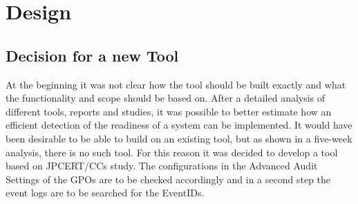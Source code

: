 \section{Design}
\subsection{Decision for a new Tool}
At the beginning it was not clear how the tool should be built exactly and what the functionality and scope should be based on. After a detailed analysis of different tools, reports and studies, it was possible to better estimate how an efficient detection of the readiness of a system can be implemented. It would have been desirable to be able to build on an existing tool, but as shown in a five-week analysis, there is no such tool. For this reason it was decided to develop a tool based on JPCERT/CCs study. The configurations in the Advanced Audit Settings of the GPOs are to be checked accordingly and in a second step the event logs are to be searched for the EventIDs.

\clearpage

